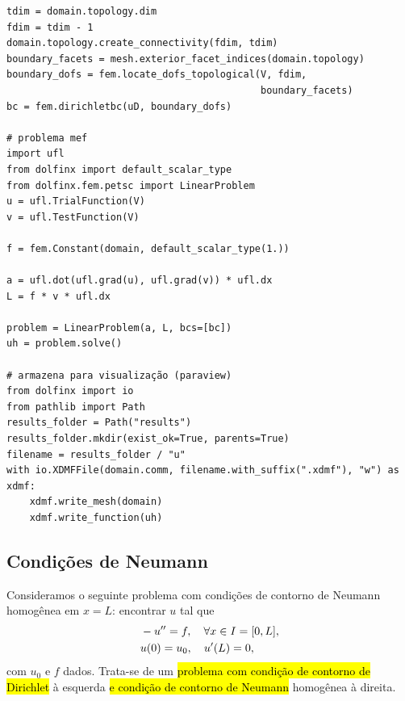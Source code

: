 \begin{ex}
\begin{lstlisting}[caption=ex\_mef1d\_dirichlet.py]
tdim = domain.topology.dim
fdim = tdim - 1
domain.topology.create_connectivity(fdim, tdim)
boundary_facets = mesh.exterior_facet_indices(domain.topology)
boundary_dofs = fem.locate_dofs_topological(V, fdim,
                                            boundary_facets)
bc = fem.dirichletbc(uD, boundary_dofs)

# problema mef
import ufl
from dolfinx import default_scalar_type
from dolfinx.fem.petsc import LinearProblem
u = ufl.TrialFunction(V)
v = ufl.TestFunction(V)

f = fem.Constant(domain, default_scalar_type(1.))

a = ufl.dot(ufl.grad(u), ufl.grad(v)) * ufl.dx
L = f * v * ufl.dx

problem = LinearProblem(a, L, bcs=[bc])
uh = problem.solve()

# armazena para visualização (paraview)
from dolfinx import io
from pathlib import Path
results_folder = Path("results")
results_folder.mkdir(exist_ok=True, parents=True)
filename = results_folder / "u"
with io.XDMFFile(domain.comm, filename.with_suffix(".xdmf"), "w") as xdmf:
    xdmf.write_mesh(domain)
    xdmf.write_function(uh)
\end{lstlisting}
\end{ex}

\subsection{Condições de Neumann}
\badgeRevisar

Consideramos o seguinte problema com condições de contorno de Neumann{\neumann} homogênea em $x=L$: encontrar $u$ tal que
\begin{align}\hleq
  &-u'' = f,\quad \forall x\in I=[0, L],\label{eq:cc_n_eq}\\
  &u(0) = u_0,\quad u'(L) = 0,\label{eq:cc_n_bc}
\end{align}
com $u_0$ e $f$ dados. Trata-se de um \hl{problema com condição de contorno de Dirichlet} à esquerda \hl{e condição de contorno de Neumann}{\neumann} homogênea à direita.


